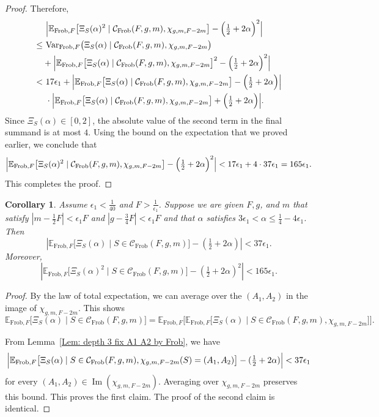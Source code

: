 \documentclass[12pt]{amsart}
\def\E{{\mathbb E}}
\newcommand{\cC}{\mathcal{C}}
\def\Var{{\operatorname{Var}}}
\newcommand{\Frob}{\text{Frob}}
\newtheorem{corollary}[theorem]{Corollary}
\begin{document}
\begin{proof}
Therefore,
\begin{align*}
&\ \Bigl|\E_{\Frob,F}\big[\Xi_S(\alpha)^2\mid \cC_{\Frob}(F,g,m), \chi_{g,m,F-2m}\big]-\Big(\tfrac12+2\alpha\Big)^2\Bigr|\\
\leq &\  \Var_{\Frob,F}\big(\Xi_S(\alpha)\mid \cC_{\Frob}(F,g,m), \chi_{g,m,F-2m}\big)\\
& + \Bigl|\E_{\Frob,F}\big[\Xi_S(\alpha)\mid \cC_{\Frob}(F,g,m), \chi_{g,m,F-2m}\big]^2 -\Big(\tfrac12+2\alpha\Big)^2\Bigr|\\
< &\ 17 \epsilon_1
+ \Bigl|\E_{\Frob,F}\big[\Xi_S(\alpha)\mid \cC_{\Frob}(F,g,m), \chi_{g,m,F-2m}\big]-\Big(\tfrac12+2\alpha\Big)\Bigr| \\
&\ \cdot\Bigl|\E_{\Frob,F}\big[\Xi_S(\alpha)\mid\cC_{\Frob}(F,g,m), \chi_{g,m,F-2m}\big]+\Big(\tfrac12+2\alpha\Big)\Bigr|.
\end{align*}
Since $\Xi_S(\alpha)\in[0,2]$, the absolute value of the second term in the final summand is at most $4$. Using the bound on the expectation that we proved earlier, we conclude that
\[
\Bigl|\E_{\Frob,F}\big[\Xi_S(\alpha)^2\mid \cC_{\Frob}(F,g,m), \chi_{g,m,F-2m}\big]-\Big(\tfrac12+2\alpha\Big)^2\Bigr|
< 17 \epsilon_1 + 4\cdot 37\epsilon_1 = 165\epsilon_1.
\]
This completes the proof.
\end{proof}


\begin{corollary}\label{Cor: depth 3 fix gml by Frob}
Assume $\epsilon_1< \frac{1}{40}$ and $F>\frac{1}{\epsilon_1}$.
Suppose we are given $F,g$, and $m$ that satisfy $|m-\frac{1}{2}F|<\epsilon_1 F$ and $|g-\frac{3}{4}F|<\epsilon_1 F$ and that $\alpha$ satisfies $3\epsilon_1<\alpha\le \frac{1}{4}-4\epsilon_1$.
Then
\[
\left|\E_{\Frob,F} \big[\Xi_S(\alpha)\mid S\in \cC_{\Frob}(F,g,m) \big]-\left(\tfrac{1}{2}+2\alpha\right)\right|
< 37\epsilon_1. 
\]
Moreover,
\[
\left|\E_{\Frob,F} \big[\Xi_S(\alpha)^2\mid S\in \cC_{\Frob}(F,g,m) \big]-\left(\tfrac{1}{2}+2\alpha\right)^2\right|
< 165\epsilon_1. 
\]    
\end{corollary}
\begin{proof}
By the law of total expectation, we can average over the $(A_1,A_2)$ in the image of $\chi_{g,m,F-2m}$. This shows 
\[
\E_{\Frob,F}\big[\Xi_S(\alpha)\mid S\in \cC_{\Frob}(F,g,m)\big]
=\E_{\Frob,F}\big[\E_{\Frob,F}\big[\Xi_S(\alpha)\mid S\in \cC_{\Frob}(F,g,m),\chi_{g,m,F-2m}\big]\big].
\]

From Lemma~\ref{Lem: depth 3 fix A1 A2 by Frob}, we have
\[
\Bigl|\E_{\Frob,F} \big[\Xi_S(\alpha)\mid S\in \cC_{\Frob}(F,g,m),\chi_{g,m,F-2m}(S)=(A_1,A_2)\big]
-(\tfrac{1}{2}+2\alpha)\Bigr|< 37\epsilon_1
\]
for every $(A_1,A_2)\in \operatorname{Im}(\chi_{g,m,F-2m})$. Averaging over $\chi_{g,m,F-2m}$ preserves
this bound.  This proves the first claim. The proof of the second claim is identical.
\end{proof}
\end{document}
